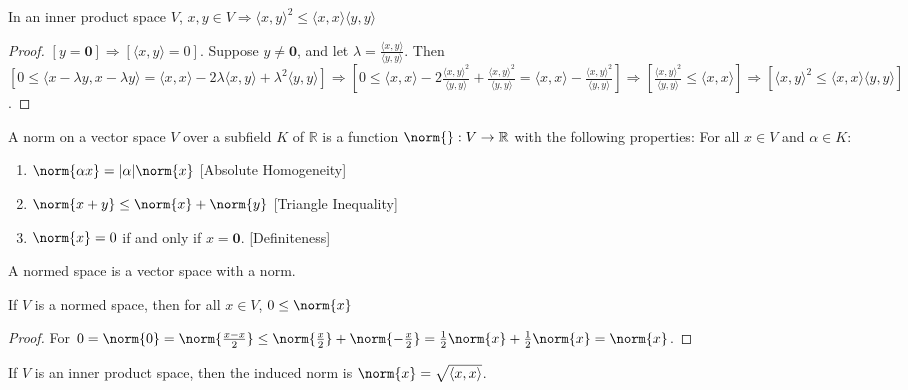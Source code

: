 \documentclass[crop=false,class=article,oneside]{standalone}
\begin{document}
        \begin{theorem}
        In an inner product space $V$, $x,y\in V\Rightarrow \langle x,y \rangle^2 \leq \langle x,x \rangle \langle y,y \rangle$
        \end{theorem}
        \begin{proof}
        $[y=\mathbf{0}]\Rightarrow [\langle x,y\rangle = 0]$. Suppose $y\ne \mathbf{0}$, and let $\lambda = \frac{\langle x,y \rangle}{\langle y,y \rangle}$. Then $[0 \leq \langle x-\lambda y, x-\lambda y\rangle = \langle x,x \rangle - 2\lambda \langle x,y \rangle + \lambda^2 \langle y,y \rangle]\Rightarrow [0\leq \langle x,x \rangle - 2\frac{\langle x,y \rangle ^2 }{\langle y,y \rangle} + \frac{\langle x,y \rangle^2}{\langle y,y \rangle} = \langle x,x \rangle - \frac{\langle x,y \rangle^2}{\langle y,y \rangle}]\Rightarrow [\frac{\langle x,y \rangle ^2}{\langle y,y \rangle} \leq \langle x,x \rangle]\Rightarrow [\langle x,y \rangle^2 \leq \langle x,x \rangle \langle y,y \rangle]$.
        \end{proof}
        \begin{definition}
        A norm on a vector space $V$ over a subfield $K$ of $\mathbb{R}$ is a function $\norm{}:V\rightarrow \mathbb{R}$ with the following properties: For all $x \in V$ and $\alpha \in K$:
        \begin{enumerate}
        \item $\norm{\alpha x} = |\alpha| \norm{x}$ \hfill [Absolute Homogeneity]
        \item $\norm{x+y} \leq \norm{x}+\norm{y}$ \hfill [Triangle Inequality]
        \item $\norm{x} = 0$ if and only if $x = \mathbf{0}$. \hfill [Definiteness]
        \end{enumerate}
        \end{definition}
        \begin{definition}
        A normed space is a vector space with a norm.
        \end{definition}
        \begin{theorem}
        If $V$ is a normed space, then for all $x\in V$, $0\leq \norm{x}$
        \end{theorem}
        \begin{proof}
        For $0=\norm{0} = \norm{\frac{x-x}{2}} \leq \norm{\frac{x}{2}}+\norm{-\frac{x}{2}} = \frac{1}{2}\norm{x} + \frac{1}{2}\norm{x} = \norm{x}$.
        \end{proof}
        \begin{definition}
        If $V$ is an inner product space, then the induced norm is $\norm{x}=\sqrt{\langle x,x \rangle}$.
        \end{definition}
\end{document}

